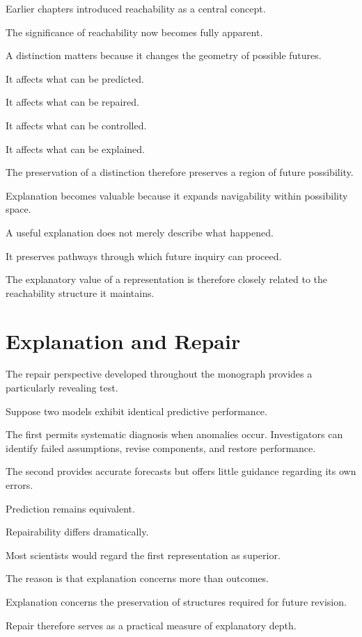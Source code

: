 \documentclass[11pt,oneside,openany]{book}
\begin{document}
Earlier chapters introduced reachability as a central concept.

The significance of reachability now becomes fully apparent.

A distinction matters because it changes the geometry of possible futures.

It affects what can be predicted.

It affects what can be repaired.

It affects what can be controlled.

It affects what can be explained.

The preservation of a distinction therefore preserves a region of future possibility.

Explanation becomes valuable because it expands navigability within possibility space.

A useful explanation does not merely describe what happened.

It preserves pathways through which future inquiry can proceed.

The explanatory value of a representation is therefore closely related to the reachability structure it maintains.

\section{Explanation and Repair}

The repair perspective developed throughout the monograph provides a particularly revealing test.

Suppose two models exhibit identical predictive performance.

The first permits systematic diagnosis when anomalies occur. Investigators can identify failed assumptions, revise components, and restore performance.

The second provides accurate forecasts but offers little guidance regarding its own errors.

Prediction remains equivalent.

Repairability differs dramatically.

Most scientists would regard the first representation as superior.

The reason is that explanation concerns more than outcomes.

Explanation concerns the preservation of structures required for future revision.

Repair therefore serves as a practical measure of explanatory depth.
\end{document}
